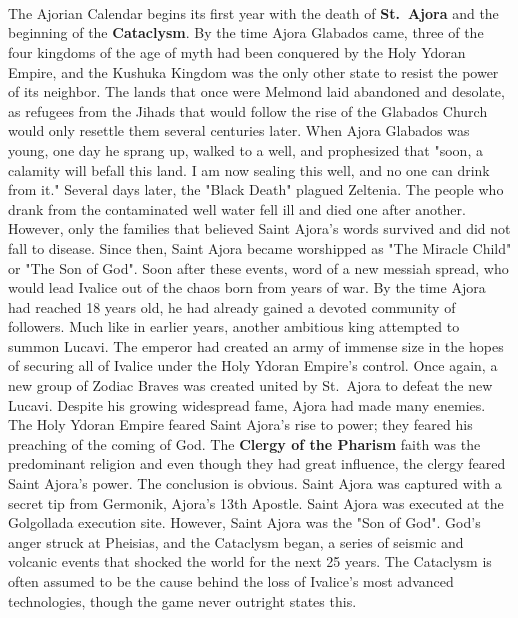 \\\\
%
\\
The Ajorian Calendar begins its first year with the death of \textbf{St.~Ajora} and the beginning of the \textbf{Cataclysm}. 
By the time Ajora Glabados came, three of the four kingdoms of the age of myth had been conquered by the Holy Ydoran Empire, and the Kushuka Kingdom was the only other state to resist the power of its neighbor. 
The lands that once were Melmond laid abandoned and desolate, as refugees from the Jihads that would follow the rise of the Glabados Church would only resettle them several centuries later.
When Ajora Glabados was young, one day he sprang up, walked to a well, and prophesized that "soon, a calamity will befall this land. 
I am now sealing this well, and no one can drink from it." Several days later, the "Black Death" plagued Zeltenia. 
The people who drank from the contaminated well water fell ill and died one after another.
However, only the families that believed Saint Ajora's words survived and did not fall to disease. 
Since then, Saint Ajora became worshipped as "The Miracle Child" or "The Son of God".
Soon after these events, word of a new messiah spread, who would lead Ivalice out of the chaos born from years of war. 
By the time Ajora had reached 18 years old, he had already gained a devoted community of followers. 
Much like in earlier years, another ambitious king attempted to summon Lucavi. 
The emperor had created an army of immense size in the hopes of securing all of Ivalice under the Holy Ydoran Empire’s control. 
Once again, a new group of Zodiac Braves was created united by St.~Ajora to defeat the new Lucavi.
Despite his growing widespread fame, Ajora had made many enemies. 
The Holy Ydoran Empire feared Saint Ajora's rise to power; they feared his preaching of the coming of God. 
The \textbf{Clergy of the Pharism} faith was the predominant religion and even though they had great influence, the clergy feared Saint Ajora's power. 
The conclusion is obvious.
Saint Ajora was captured with a secret tip from Germonik, Ajora's 13th Apostle. 
Saint Ajora was executed at the Golgollada execution site. 
However, Saint Ajora was the "Son of God". 
God's anger struck at Pheisias, and the Cataclysm began, a series of seismic and volcanic events that shocked the world for the next 25 years.
The Cataclysm is often assumed to be the cause behind the loss of Ivalice's most advanced technologies, though the game never outright states this. 
